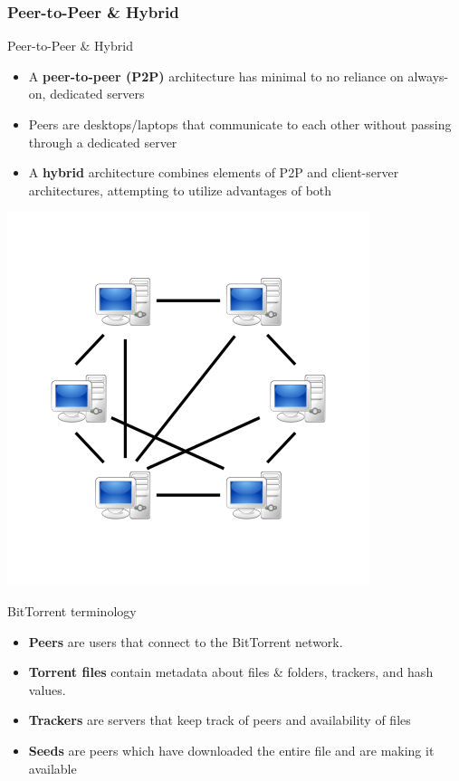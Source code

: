 \documentclass{beamer}
\begin{document}
        \subsubsection{Peer-to-Peer \& Hybrid}
        \begin{frame}{Peer-to-Peer \& Hybrid}
            \begin{itemize}
                \item A \textbf{peer-to-peer (P2P)} architecture has minimal to no reliance on always-on, dedicated servers
                \item Peers are desktops/laptops that communicate to each other without passing through a dedicated server
                \item A \textbf{hybrid} architecture combines elements of P2P and client-server architectures, attempting to utilize advantages of both
            \end{itemize}
            \centering
            \includegraphics[scale=0.5]{P2P-network.png}
        \end{frame}
        \begin{frame}{BitTorrent terminology}
            \begin{itemize} %
                \item \textbf{Peers} are users that connect to the BitTorrent network.
                \item \textbf{Torrent files} contain metadata about files \& folders, trackers, and hash values.
                \item \textbf{Trackers} are servers that keep track of peers and availability of files
                \item \textbf{Seeds} are peers which have downloaded the entire file and are making it available
            \end{itemize}
        \end{frame}
\end{document}
